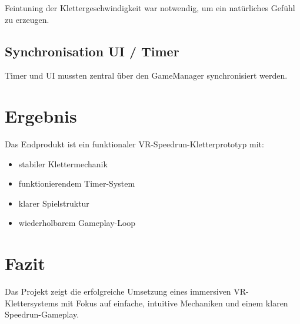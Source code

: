 \documentclass[11pt,a4paper]{article}
\begin{document}
Feintuning der Klettergeschwindigkeit war notwendig, um ein natürliches Gefühl zu erzeugen.

\subsection{Synchronisation UI / Timer}

Timer und UI mussten zentral über den GameManager synchronisiert werden.

\section{Ergebnis}

Das Endprodukt ist ein funktionaler VR-Speedrun-Kletterprototyp mit:

\begin{itemize}
    \item stabiler Klettermechanik
    \item funktionierendem Timer-System
    \item klarer Spielstruktur
    \item wiederholbarem Gameplay-Loop
\end{itemize}

\section{Fazit}

Das Projekt zeigt die erfolgreiche Umsetzung eines immersiven VR-Klettersystems mit Fokus auf einfache, intuitive Mechaniken und einem klaren Speedrun-Gameplay.
\end{document}
